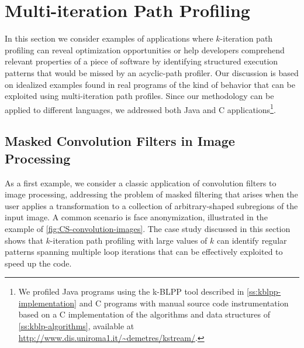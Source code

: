 \section{Multi-iteration Path Profiling}
\label{se:kblpp-case-studies}
In this section we consider examples of applications where $k$-iteration path profiling can reveal optimization opportunities or help developers comprehend relevant properties of a piece of software by identifying structured execution patterns that would be missed by an acyclic-path profiler. Our discussion is based on idealized examples found in real programs of the kind of behavior that can be exploited using multi-iteration path profiles. Since our methodology can be applied to different languages, we addressed both Java and C applications\footnote{We profiled Java programs using the k-BLPP tool described in \mysection\ref{ss:kblpp-implementation} and C programs with manual source code instrumentation based on a C implementation of the algorithms and data structures of \mysection\ref{ss:kblp-algorithms}, available at \url{http://www.dis.uniroma1.it/~demetres/kstream/}. }.

\subsection{Masked Convolution Filters in Image Processing}
\label{ss:convolution}

As a first example, we consider a classic application of convolution filters to image processing, addressing the problem of masked filtering that arises when the user applies a transformation to a collection of arbitrary-shaped subregions of the input image. A common scenario is face anonymization, illustrated in the example of \myfigure\ref{fig:CS-convolution-images}. The case study discussed in this section shows that $k$-iteration path profiling with large values of $k$ can identify regular patterns spanning multiple loop iterations that can be effectively exploited to speed up the code.

